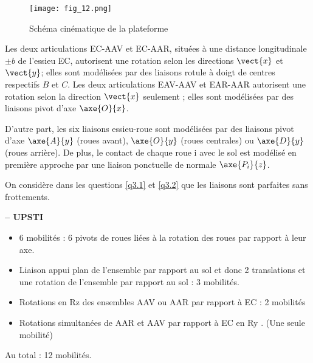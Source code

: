 \begin{figure}[H]
\centering
\texttt{[image: fig\_12.png]}
\caption{Schéma cinématique de la plateforme\label{fig_12}}
\end{figure}

Les deux articulations EC-AAV et EC-AAR, situées à une distance longitudinale $\pm b$ de l'essieu
EC, autorisent une rotation selon les directions $\vect{x}$ et $\vect{y}$; elles sont modélisées par des liaisons
rotule à doigt de centres respectifs $B$ et $C$. Les deux articulations EAV-AAV et EAR-AAR
autorisent une rotation selon la direction $\vect{x}$ seulement ; elles sont modélisées par des liaisons
pivot d'axe $\axe{O}{x}$.

D'autre part, les six liaisons essieu-roue sont modélisées par des liaisons pivot d'axe $\axe{A}{y}$
(roues avant), $\axe{O}{y}$ (roues centrales) ou $\axe{D}{y}$ (roues arrière). De plus, le contact de chaque
roue i avec le sol est modélisé en première approche par une liaison ponctuelle de normale
$\axe{P_i}{z}$.

On considère dans les questions \ref{q3.1} et \ref{q3.2} que les liaisons sont parfaites sans frottements.

\fi

\ifprof
\begin{corrige}\textbf{ -- UPSTI}\\ 
\vspace{-.3cm}
\begin{itemize}
\item 6 mobilités : 6 pivots de roues liées à la rotation des roues par rapport à leur axe.
\item Liaison appui plan de l’ensemble par rapport au sol et donc 2 translations et une rotation de l’ensemble par rapport au sol : 3 mobilités.
\item Rotations en Rz des ensembles AAV ou AAR par rapport à EC : 2 mobilités
\item Rotations simultanées de AAR et AAV par rapport à EC en Ry . (Une seule mobilité)
\end{itemize}
Au total : 12 mobilités. 
\end{corrige}
\else
\fi

